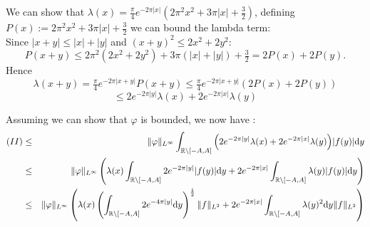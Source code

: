 \documentclass[11pt,a4paper]{article}
\begin{document}
We can show that $\lambda(x)=\frac{\pi}{4}e^{-2\pi \lvert x\rvert}\left(2\pi^2x^2+3\pi \lvert x\rvert +\frac{3}{2}\right)$, defining $P(x):=2\pi^2x^2+3\pi|x|+\tfrac32$ we can bound the lambda term: \\
Since
\(|x+y|\le|x|+|y|\) and \((x+y)^2\le2x^2+2y^2\):
\[
P(x+y)
\le2\pi^2(2x^2+2y^2)+3\pi(|x|+|y|)+\tfrac32
=2P(x)+2P(y).
\]
Hence
\[
\lambda(x+y)
=\tfrac\pi4e^{-2\pi|x+y|}P(x+y)
\le\tfrac\pi4e^{-2\pi|x+y|}(2P(x)+2P(y))
\]
\[
\leq 2e^{-2\pi|y|}\lambda(x)+2e^{-2\pi|x|}\lambda(y)
\]


Assuming we can show that $\varphi$ is bounded, we now have :
\begin{eqnarray*}
(II) &\leq& \|\varphi\|_{L^\infty} \int_{\mathbb R \setminus [-A,A]} \Big( 2e^{-2\pi|y|}\lambda(x)+2e^{-2\pi|x|}\lambda(y)\Big)|f(y)|\mathrm{d}y \\
&\leq&  \|\varphi\|_{L^\infty} \left( \lambda(x) \int_{\mathbb R \setminus [-A,A]} 2e^{-2\pi|y|}|f(y)|\mathrm{d}y +   2e^{-2\pi|x|}\int_{\mathbb R \setminus [-A,A]} \lambda(y)|f(y)|\mathrm{d}y\right)\\
&\leq&  \|\varphi\|_{L^\infty} \left( \lambda(x) \left(\int_{\mathbb R \setminus [-A,A]} 2e^{-4\pi|y|}\mathrm{d}y\right)^\frac{1}{2} \|f\|_{L^2} +   2e^{-2\pi|x|}\int_{\mathbb R \setminus [-A,A]} \lambda(y)^2\mathrm{d}y\|f\|_{L^2}\right)\\
\end{eqnarray*}
\end{document}
